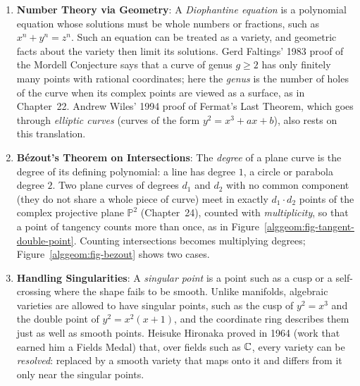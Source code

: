 \begin{enumerate}
  \item \textbf{Number Theory via Geometry}: A \emph{Diophantine equation} is a polynomial equation whose solutions must be whole numbers or fractions, such as $x^n + y^n = z^n$. Such an equation can be treated as a variety, and geometric facts about the variety then limit its solutions. Gerd Faltings' 1983 proof of the Mordell Conjecture says that a curve of genus $g \ge 2$ has only finitely many points with rational coordinates; here the \emph{genus} is the number of holes of the curve when its complex points are viewed as a surface, as in Chapter~22. Andrew Wiles' 1994 proof of Fermat's Last Theorem, which goes through \emph{elliptic curves} (curves of the form $y^2 = x^3 + ax + b$), also rests on this translation.
  \item \textbf{B\'ezout's Theorem on Intersections}: The \emph{degree} of a plane curve is the degree of its defining polynomial: a line has degree $1$, a circle or parabola degree $2$. Two plane curves of degrees $d_1$ and $d_2$ with no common component (they do not share a whole piece of curve) meet in exactly $d_1 \cdot d_2$ points of the complex projective plane $\mathbb{P}^2$ (Chapter~24), counted with \emph{multiplicity}, so that a point of tangency counts more than once, as in Figure~\ref{alggeom:fig-tangent-double-point}. Counting intersections becomes multiplying degrees; Figure~\ref{alggeom:fig-bezout} shows two cases.
  \item \textbf{Handling Singularities}: A \emph{singular point} is a point such as a cusp or a self-crossing where the shape fails to be smooth. Unlike manifolds, algebraic varieties are allowed to have singular points, such as the cusp of $y^2 = x^3$ and the double point of $y^2 = x^2(x+1)$, and the coordinate ring describes them just as well as smooth points. Heisuke Hironaka proved in 1964 (work that earned him a Fields Medal) that, over fields such as $\mathbb{C}$, every variety can be \emph{resolved}: replaced by a smooth variety that maps onto it and differs from it only near the singular points.
\end{enumerate}

